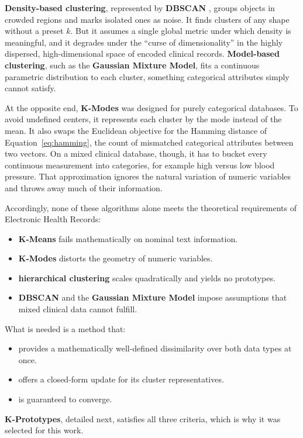 \textbf{Density-based clustering}, represented by \textbf{DBSCAN} \cite{ester1996}, groups objects in crowded regions and marks isolated ones as noise. It finds clusters of any shape without a preset $k$. But it assumes a single global metric under which density is meaningful, and it degrades under the ``curse of dimensionality'' in the highly dispersed, high-dimensional space of encoded clinical records. \textbf{Model-based clustering}, such as the \textbf{Gaussian Mixture Model}, fits a continuous parametric distribution to each cluster, something categorical attributes simply cannot satisfy.

At the opposite end, \textbf{K-Modes} was designed for purely categorical databases. To avoid undefined centers, it represents each cluster by the mode instead of the mean. It also swaps the Euclidean objective for the Hamming distance of Equation~\eqref{eq:hamming}, the count of mismatched categorical attributes between two vectors. On a mixed clinical database, though, it has to bucket every continuous measurement into categories, for example high versus low blood pressure. That approximation ignores the natural variation of numeric variables and throws away much of their information.

Accordingly, none of these algorithms alone meets the theoretical requirements of Electronic Health Records:

\begin{itemize}
    \item \textbf{K-Means} fails mathematically on nominal text information.
    \item \textbf{K-Modes} distorts the geometry of numeric variables.
    \item \textbf{hierarchical clustering} scales quadratically and yields no prototypes.
    \item \textbf{DBSCAN} and the \textbf{Gaussian Mixture Model} impose assumptions that mixed clinical data cannot fulfill.
\end{itemize}
\vspace{0.5cm}
What is needed is a method that:
\begin{itemize}
    \item provides a mathematically well-defined dissimilarity over both data types at once.
    \item offers a closed-form update for its cluster representatives.
    \item is guaranteed to converge.
\end{itemize}
\textbf{K-Prototypes}, detailed next, satisfies all three criteria, which is why it was selected for this work.

